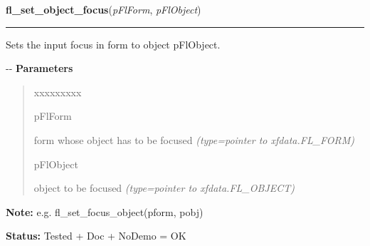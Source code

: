 \hspace{.8\funcindent}\begin{boxedminipage}{\funcwidth}

    \raggedright \textbf{fl\_set\_object\_focus}(\textit{pFlForm}, \textit{pFlObject})

    \vspace{-1.5ex}

    \rule{\textwidth}{0.5\fboxrule}
\setlength{\parskip}{2ex}

Sets the input focus in form to object pFlObject.

-{}-
\setlength{\parskip}{1ex}
      \textbf{Parameters}
      \vspace{-1ex}

      \begin{quote}
        \begin{Ventry}{xxxxxxxxx}

          \item[pFlForm]


form whose object has to be focused
            {\it (type=pointer to xfdata.FL\_FORM)}

          \item[pFlObject]


object to be focused
            {\it (type=pointer to xfdata.FL\_OBJECT)}

        \end{Ventry}

      \end{quote}

\textbf{Note:} 
e.g. fl\_set\_focus\_object(pform, pobj)


\textbf{Status:} 
Tested + Doc + NoDemo = OK


    \end{boxedminipage}

    \label{xformslib:flbasic:fl_get_focus_object}

    \vspace{0.5ex}

